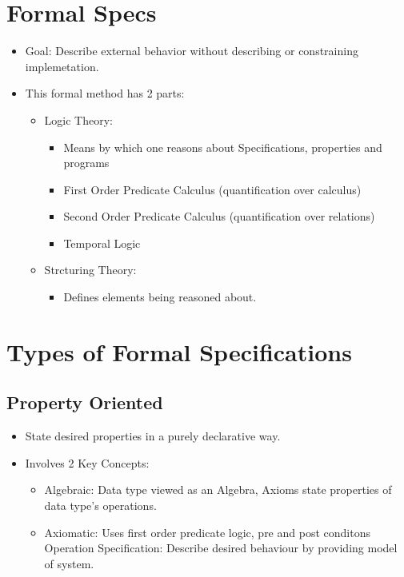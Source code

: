 \documentclass{article}
\begin{document}
    \section{Formal Specs}
    \begin{itemize}
        \item Goal: Describe external behavior without describing or constraining implemetation.
        \item This formal method has 2 parts:\begin{itemize}
            \item Logic Theory:\begin{itemize}
                \item Means by which one reasons about Specifications, properties and programs
                \item First Order Predicate Calculus (quantification over calculus)
                \item Second Order Predicate Calculus (quantification over relations)
                \item Temporal Logic
            \end{itemize}
            \item Strcturing Theory:\begin{itemize}
                \item Defines elements being reasoned about.
            \end{itemize}
        \end{itemize} 
    \end{itemize}
    \section{Types of Formal Specifications}
    \subsection{Property Oriented}\begin{itemize}
        \item State desired properties in a purely declarative way.
        \item Involves 2 Key Concepts:\begin{itemize}
            \item Algebraic: Data type viewed as an Algebra, Axioms state properties of data type's operations.
            \item Axiomatic: Uses first order predicate logic, pre and post conditons Operation Specification: Describe
            desired behaviour by providing model of system.
        \end{itemize}
    \end{itemize}
\end{document}
